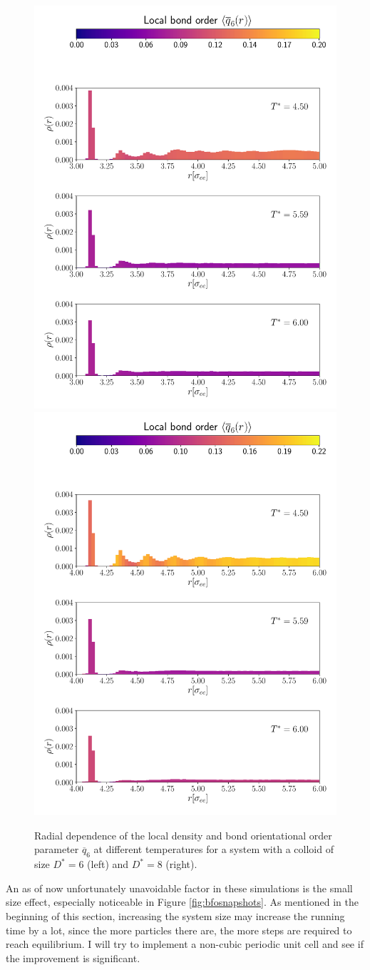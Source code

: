 \begin{figure}[H]
    \centering
	\includegraphics[width=0.49\linewidth]{plots/bfo_C80_raddensD6.pdf}
	\includegraphics[width=0.49\linewidth]{plots/bfo_C80_raddensD8.pdf}
	\caption{Radial dependence of the local density and bond orientational order parameter $ \overline{q}_6$ at different temperatures for a system with a colloid of size $D^* =  6$ (left) and $D^* = 8$ (right).}
    \label{fig:beoc32nemloc}
\end{figure}


An as of now unfortunately unavoidable factor in these simulations is the small size effect, especially noticeable in Figure \ref{fig:bfosnapshots}. As mentioned in the beginning of this section, increasing the system size may increase the running time by a lot, since the more particles there are, the more steps are required to reach equilibrium. I will try to implement a non-cubic periodic unit cell and see if the improvement is significant.
